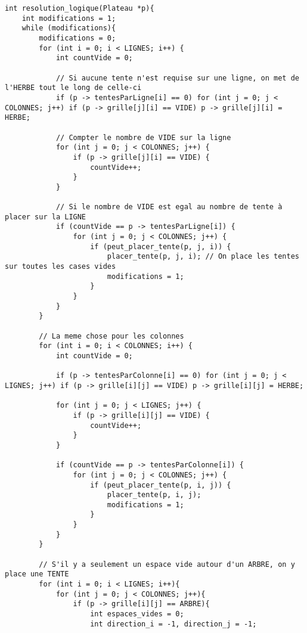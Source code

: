 \documentclass{article}
\begin{document}
\begin{lstlisting}[style=Cstyle]
int resolution_logique(Plateau *p){
    int modifications = 1;
    while (modifications){
        modifications = 0;
        for (int i = 0; i < LIGNES; i++) {
            int countVide = 0;

            // Si aucune tente n'est requise sur une ligne, on met de l'HERBE tout le long de celle-ci
            if (p -> tentesParLigne[i] == 0) for (int j = 0; j < COLONNES; j++) if (p -> grille[j][i] == VIDE) p -> grille[j][i] = HERBE;
            
            // Compter le nombre de VIDE sur la ligne
            for (int j = 0; j < COLONNES; j++) {
                if (p -> grille[j][i] == VIDE) {
                    countVide++;
                }
            }

            // Si le nombre de VIDE est egal au nombre de tente à placer sur la LIGNE
            if (countVide == p -> tentesParLigne[i]) {
                for (int j = 0; j < COLONNES; j++) {
                    if (peut_placer_tente(p, j, i)) { 
                        placer_tente(p, j, i); // On place les tentes sur toutes les cases vides
                        modifications = 1;
                    }
                }
            }
        }

        // La meme chose pour les colonnes
        for (int i = 0; i < COLONNES; i++) {
            int countVide = 0;

            if (p -> tentesParColonne[i] == 0) for (int j = 0; j < LIGNES; j++) if (p -> grille[i][j] == VIDE) p -> grille[i][j] = HERBE;
            
            for (int j = 0; j < LIGNES; j++) {
                if (p -> grille[i][j] == VIDE) {
                    countVide++;
                }
            }
            
            if (countVide == p -> tentesParColonne[i]) {
                for (int j = 0; j < COLONNES; j++) {
                    if (peut_placer_tente(p, i, j)) {
                        placer_tente(p, i, j);
                        modifications = 1;
                    }
                }
            }
        }
        
        // S'il y a seulement un espace vide autour d'un ARBRE, on y place une TENTE
        for (int i = 0; i < LIGNES; i++){
            for (int j = 0; j < COLONNES; j++){
                if (p -> grille[i][j] == ARBRE){
                    int espaces_vides = 0;
                    int direction_i = -1, direction_j = -1;


\end{lstlisting}
\end{document}
